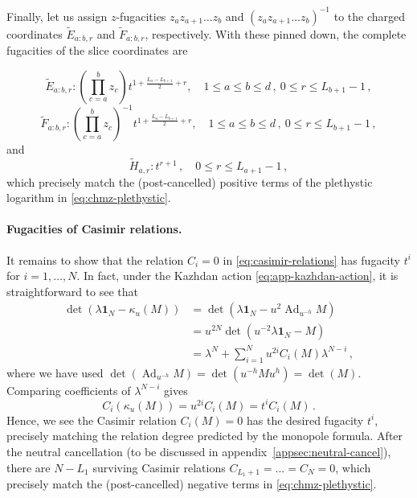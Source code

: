 \documentclass[12pt,a4paper]{article}
\begin{document}
Finally, let us assign $z$-fugacities $z_az_{a+1}\dots z_b$ and $ (z_az_{a+1}\dots z_b)^{-1}$ to the charged coordinates $\tilde{E}_{a:b,r}$ and $\tilde{F}_{a:b,r}$, respectively. With these pinned down, the complete fugacities of the slice coordinates are

\begin{equation}\label{eq:slodowy-e-fugacity}
    \tilde{E}_{a:b,r}:\left(\prod_{c=a}^b z_c\right) t^{1+\frac{L_a-L_{b+1}}{2}+r}, \quad 1\leq a\leq b\leq d\,,\  0\leq r\leq L_{b+1}-1\,,
\end{equation}
\begin{equation}\label{eq:slodowy-f-fugacity}
    \tilde{F}_{a:b,r}:\left(\prod_{c=a}^b z_c\right)^{-1} t^{1+\frac{L_a-L_{b+1}}{2}+r}, \quad 1\leq a\leq b\leq d\,,\  0\leq r\leq L_{b+1}-1\,,
\end{equation}
and 
\begin{equation}\label{eq:slodowy-h-fugacity}
    \tilde{H}_{a,r}:t^{r+1}\,, \quad 0\leq r\leq L_{a+1}-1\,,
\end{equation}
which precisely match the (post-cancelled) positive terms of the plethystic logarithm in \eqref{eq:chmz-plethystic}.

\paragraph{Fugacities of Casimir relations.} It remains to show that the relation $C_i=0$ in \eqref{eq:casimir-relations} has fugacity $t^i$ for $i=1,\dots,N$. In fact, under the Kazhdan action \eqref{eq:app-kazhdan-action}, it is straightforward to see that
\begin{equation}
    \begin{aligned}
 \det\!\left(\lambda\mathbf 1_N-\kappa_u(M)\right)
 &=\det\!\left(\lambda\mathbf 1_N-u^2
       \operatorname{Ad}_{u^{-h}}M\right)\\
 &=u^{2N}\det\!\left(u^{-2}\lambda\mathbf 1_N-M\right)\\
 &=\lambda^N+\sum_{i=1}^{N}u^{2i}C_i(M)\lambda^{N-i}\,,
\end{aligned}
\label{eq:app-kazhdan-determinant-scaling}
\end{equation}
where we have used $\det\!\left(\operatorname{Ad}_{u^{-h}}M\right)=\det\!\left(u^{-h}M u^{h}\right)=\det\!\left(M\right)$. Comparing coefficients of $\lambda^{N-i}$ gives
\begin{equation}
 C_i(\kappa_u(M))=u^{2i}C_i(M)=t^iC_i(M)\,.
 \label{eq:app-kazhdan-Ci-degree}
\end{equation}
Hence, we see the Casimir relation $C_i(M)=0$ has the desired fugacity $t^i$, precisely matching the relation degree predicted by the monopole formula. After the neutral cancellation (to be discussed in appendix~\ref{appsec:neutral-cancel}), there are $N-L_1$ surviving Casimir relations $C_{L_1+1}=\dots=C_N=0$, which precisely match the (post-cancelled) negative terms in \eqref{eq:chmz-plethystic}.
\end{document}
